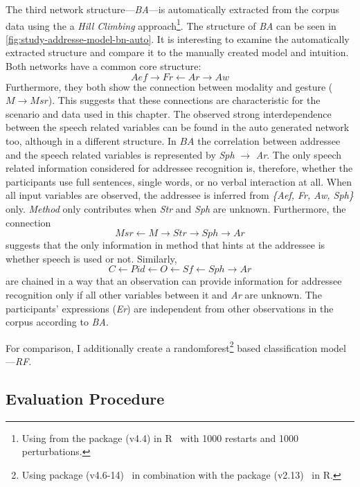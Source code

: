 The third network structure---\emph{BA}---is automatically extracted from the corpus data using the a \emph{Hill Climbing} approach\footnote{Using  from the  package (v4.4) in R~\cite{bnlearn} with 1000 restarts and 1000 perturbations.}.
The structure of \emph{BA} can be seen in \cref{fig:study-addresse-model-bn-auto}.
It is interesting to examine the automatically extracted structure and compare it to the manually created model and intuition.
Both networks have a common core structure: \[Aef \rightarrow Fr \leftarrow Ar \rightarrow Aw\]
Furthermore, they both show the connection between modality and gesture (\(M \rightarrow Msr\)).
This suggests that these connections are characteristic for the scenario and data used in this chapter.
The observed strong interdependence between the speech related variables can be found in the auto generated network too, although in a different structure.
In \(BA\) the correlation between \gls{addressee} and the speech related variables is represented by \emph{Sph} \(\rightarrow\) \emph{Ar}.
The only speech related information considered for \gls{addressee} recognition is, therefore, whether the participants use full sentences, single words, or no verbal interaction at all.
When all input variables are observed, the \gls{addressee} is inferred from \emph{\{Aef, Fr, Aw, Sph\}} only.
\emph{Method} only contributes when \emph{Str} and \emph{Sph} are unknown.
Furthermore, the connection \[Msr \leftarrow M \rightarrow Str \rightarrow Sph \rightarrow Ar\] suggests that the only information in method that hints at the \gls{addressee} is whether speech is used or not.
Similarly, \[C \leftarrow Pid \leftarrow O \leftarrow Sf \leftarrow Sph \rightarrow Ar\] are chained in a way that an observation can provide information for \gls{addressee} recognition only if all other variables between it and \emph{Ar} are unknown.
The participants' expressions (\emph{Er}) are independent from other observations in the corpus according to \emph{BA}.

For comparison, I additionally create a \gls{randomforest}\footnote{Using  package (v4.6-14)~\cite{randomForest} in combination with the  package (v2.13)~\cite{mlr} in R.} based classification model---\emph{RF}.

\subsection{Evaluation Procedure}\label{sec:addressee-recognizability}

